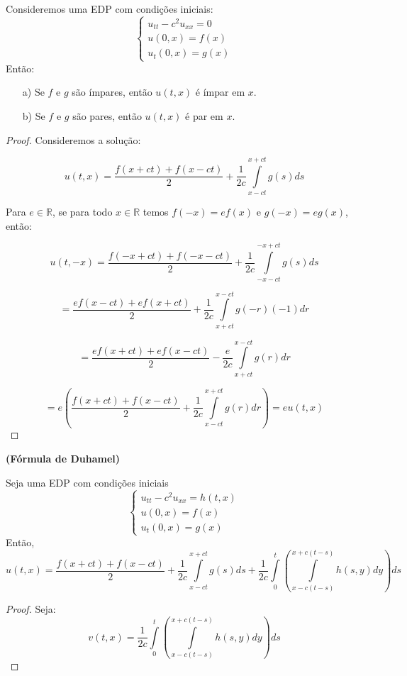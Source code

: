 \documentclass[11pt,twoside,a4paper]{book}
\begin{document}
\begin{proposicao}
Consideremos uma EDP com condições iniciais:
\[\left\{\begin{array}{cc}
     u_{tt} - c^2 u_{xx} = 0  \\
     u(0,x)  =f(x) \\
     u_t (0,x) = g(x)
\end{array}\right.\]
Então:
\begin{enumerate}
    \item[a)] Se $f$ e $g$ são ímpares, então $u(t,x)$ é ímpar em $x$.
    \item[b)] Se $f$ e $g$ são pares, então $u(t,x)$ é par em $x$.
\end{enumerate}
\end{proposicao}
\begin{proof}

Consideremos a solução:

\[u(t,x) = \frac{f(x + ct) + f(x - ct)}{2} + \frac{1}{2c} \int\limits_{x  -ct}^{x + ct} g(s) ds \]

\noindent
Para $e\in\mathbb{R}$, se para todo $x\in \mathbb{R}$ temos $f(-x)=ef(x)$ e $g(-x)=eg(x)$, então:

\[
u(t,-x)=\frac{f(-x + ct) + f(-x - ct)}{2} + \frac{1}{2c} \int\limits_{-x  -ct}^{-x + ct} g(s) ds
\]

\[
=\frac{ef(x - ct) + ef(x + ct)}{2} + \frac{1}{2c} \int\limits_{x + ct}^{x - ct} g(-r) (-1) dr
\]

\[
=\frac{ef(x + ct) + ef(x - ct)}{2} - \frac{e}{2c} \int\limits_{x + ct}^{x - ct} g(r) dr
\]

\[
=e\left(\frac{f(x + ct) + f(x - ct)}{2} + \frac{1}{2c} \int\limits_{x - ct}^{x + ct} g(r) dr\right)=eu(t,x)
\]

\end{proof}

\begin{proposicao}

\noindent
\textbf{(Fórmula de Duhamel)}

\noindent
Seja uma EDP com condições iniciais
\[\left\{\begin{array}{l}
     u_{tt} - c^2 u_{xx} = h(t,x)  \\
     u(0,x)  =f(x) \\
     u_t(0,x) = g(x)
\end{array}\right.\]
Então,
\[\boxed{u(t,x) = \frac{f(x + ct) + f(x - ct)}{2} + \frac{1}{2c}\int\limits_{x  -ct}^{x + ct} g(s) ds + \frac{1}{2c} \int\limits_{0}^{t} \left( \int\limits_{x - c(t-s)}^{x + c(t-s)} h(s,y) dy  \right) ds} \]
\end{proposicao}
\begin{proof}

Seja: 
\[
v(t,x)=\frac{1}{2c} \int\limits_{0}^{t} \left( \int\limits_{x - c(t-s)}^{x + c(t-s)} h(s,y) dy  \right) ds
\]



\end{proof}
\end{document}
